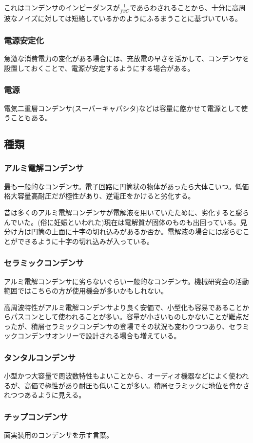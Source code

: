 \documentclass[a4paper,titlepage,here]{ujarticle}
\begin{document}
これはコンデンサのインピーダンスが$\frac{1}{jwC}$であらわされることから、十分に高周波なノイズに対しては短絡しているかのようにふるまうことに基づいている。
\subsubsection{電源安定化}
急激な消費電力の変化がある場合には、充放電の早さを活かして、コンデンサを設置しておくことで、電源が安定するようにする場合がある。
\subsubsection{電源}
電気二重層コンデンサ(スーパーキャパシタ)などは容量に飽かせて電源として使うこともある。
\subsection{種類}
\subsubsection{アルミ電解コンデンサ}
最も一般的なコンデンサ。電子回路に円筒状の物体があったら大体こいつ。低価格大容量高耐圧だが極性があり、逆電圧をかけると劣化する。

昔は多くのアルミ電解コンデンサが電解液を用いていたために、劣化すると膨らんでいた。(俗に妊娠といわれた)現在は電解質が固体のものも出回っている。見分け方は円筒の上面に十字の切れ込みがあるか否か。電解液の場合には膨らむことができるように十字の切れ込みが入っている。
\subsubsection{セラミックコンデンサ}
アルミ電解コンデンサに劣らないぐらい一般的なコンデンサ。機械研究会の活動範囲ではこちらの方が使用機会が多いかもしれない。

高周波特性がアルミ電解コンデンサより良く安価で、小型化も容易であることからパスコンとして使われることが多い。容量が小さいものしかないことが難点だったが、積層セラミックコンデンサの登場でその状況も変わりつつあり、セラミックコンデンサオンリーで設計される場合も増えている。
\subsubsection{タンタルコンデンサ}
小型かつ大容量で周波数特性もよいことから、オーディオ機器などによく使われるが、高価で極性があり耐圧も低いことが多い。積層セラミックに地位を脅かされつつあるように見える。
\subsubsection{チップコンデンサ}
面実装用のコンデンサを示す言葉。
\end{document}
